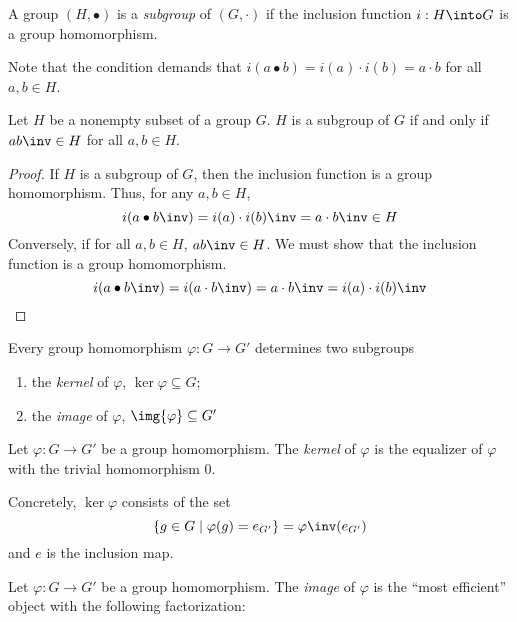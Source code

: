 \documentclass{amsart}
\begin{document}
\begin{defn}
  A group $(H, \bullet)$ is a \emph{subgroup} of $(G, \cdot)$ if the inclusion function $i : H \into G$ is a group homomorphism.
\end{defn}

Note that the condition demands that $i(a \bullet b) = i(a) \cdot i(b) = a \cdot b$ for all $a, b \in H$.

\begin{lem}
  Let $H$ be a nonempty subset of a group $G$.
  $H$ is a subgroup of $G$ if and only if $ab\inv \in H$ for all $a, b \in H$.
\end{lem}
\begin{proof}
  If $H$ is a subgroup of $G$, then the inclusion function is a group homomorphism.
  Thus, for any $a, b \in H$,
  \[
    i(a \bullet b\inv) = i(a) \cdot i(b)\inv = a \cdot b\inv \in H
  \]
  Conversely, if for all $a, b \in H$, $ab\inv \in H$.
  We must show that the inclusion function is a group homomorphism.
  \[
    i(a \bullet b\inv) = i(a \cdot b\inv) = a \cdot b\inv = i(a) \cdot i(b)\inv
  \]
\end{proof}

Every group homomorphism $\varphi : G \to G'$ determines two subgroups
\begin{enumerate}
\item the \emph{kernel} of $\varphi$, $\ker{\varphi} \subseteq G$;
\item the \emph{image} of $\varphi$, $\img{\varphi} \subseteq G'$
\end{enumerate}

\begin{defn}
  Let $\varphi : G \to G'$ be a group homomorphism.
  The \emph{kernel} of $\varphi$ is the equalizer of $\varphi$ with the trivial homomorphism $0$.
  
\end{defn}

Concretely, $\ker{\varphi}$ consists of the set
\[
  \{g \in G \mid \varphi(g) = e_{G'}\} = \varphi\inv(e_{G'})
\]
and $e$ is the inclusion map.

\begin{defn}
  Let $\varphi : G \to G'$ be a group homomorphism.
  The \emph{image} of $\varphi$ is the ``most efficient'' object with the following factorization:
  
\end{defn}
\end{document}

